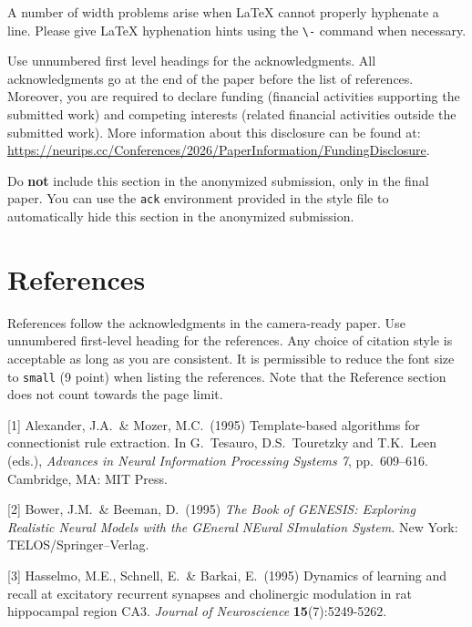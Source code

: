 \documentclass{article}
\begin{document}
A number of width problems arise when \LaTeX{} cannot properly hyphenate a
line. Please give LaTeX hyphenation hints using the \verb+\-+ command when
necessary.

\begin{ack}
  Use unnumbered first level headings for the acknowledgments. All acknowledgments
  go at the end of the paper before the list of references. Moreover, you are required to declare
  funding (financial activities supporting the submitted work) and competing interests (related financial activities outside the submitted work).
  More information about this disclosure can be found at: \url{https://neurips.cc/Conferences/2026/PaperInformation/FundingDisclosure}.


  Do {\bf not} include this section in the anonymized submission, only in the final paper. You can use the \texttt{ack} environment provided in the style file to automatically hide this section in the anonymized submission.
\end{ack}

\section*{References}


References follow the acknowledgments in the camera-ready paper. Use unnumbered first-level heading for
the references. Any choice of citation style is acceptable as long as you are
consistent. It is permissible to reduce the font size to \verb+small+ (9 point)
when listing the references.
Note that the Reference section does not count towards the page limit.
\medskip


{
\small


[1] Alexander, J.A.\ \& Mozer, M.C.\ (1995) Template-based algorithms for
connectionist rule extraction. In G.\ Tesauro, D.S.\ Touretzky and T.K.\ Leen
(eds.), {\it Advances in Neural Information Processing Systems 7},
pp.\ 609--616. Cambridge, MA: MIT Press.


  [2] Bower, J.M.\ \& Beeman, D.\ (1995) {\it The Book of GENESIS: Exploring
    Realistic Neural Models with the GEneral NEural SImulation System.}  New York:
TELOS/Springer--Verlag.


[3] Hasselmo, M.E., Schnell, E.\ \& Barkai, E.\ (1995) Dynamics of learning and
recall at excitatory recurrent synapses and cholinergic modulation in rat
hippocampal region CA3. {\it Journal of Neuroscience} {\bf 15}(7):5249-5262.
}


\end{document}

